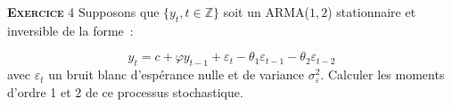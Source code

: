 \documentclass[10pt,a4paper,notitlepage,twocolumn]{article}
\newcommand{\exercice}[1]{\textsc{\textbf{Exercice}} #1}
\begin{document}
\bigskip
\bigskip

\exercice{4} Supposons que $\{y_t,t\in\mathbb Z\}$ soit un ARMA($1,2$) stationnaire et inversible de la forme~:

\[
y_t = c + \varphi y_{t-1} + \varepsilon_t - \theta_1 \varepsilon_{t-1} - \theta_2 \varepsilon_{t-2}
\]
avec $\varepsilon_t$ un bruit blanc d'espérance nulle et de
variance $\sigma_{\varepsilon}^2$. Calculer les moments d'ordre 1 et 2
de ce processus stochastique.\newline
\end{document}
